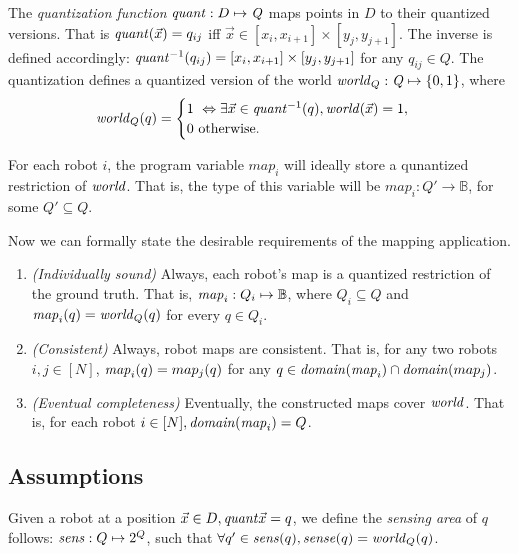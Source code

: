 %
    The \emph{quantization function}  $\mathit{quant}:D \mapsto \mathit{Q}$ maps points in $D$ to their quantized versions. That is $\mathit{quant}(\Vec{x}) = q_{ij}$ iff $\Vec{x} \in [x_i, x_{i+1}] \times [y_j, y_{j+1}]$.
The inverse is defined accordingly: $\mathit{quant}^{-1}(q_{ij}) =  [x_i, x_{i+1}] \times [y_j, y_{j+1}]$ for any $q_{ij} \in Q$. 
%
The quantization defines a quantized version of the world $\mathit{world}_Q : \mathit{Q} \mapsto \left\{0,1\right\}$, where
$$\mathit{world}_Q(q) = \begin{cases}
        1\ \Leftrightarrow \exists \Vec{x}\in \mathit{quant}^{-1}(q), \mathit{world}(\Vec{x}) = 1, \\
        0\ \mbox{otherwise}.
\end{cases}
$$
%

For each robot $i$, the program variable $\mathit{map}_i$ will ideally store a qunantized restriction of $\mathit{world}$. That is, the type of this variable will be $\mathit{map}_i: Q' \rightarrow \mathbb{B}$, for some $Q' \subseteq Q$. 

Now we can formally state the desirable requirements of the mapping application.
\begin{enumerate}
	\item {\em (Individually sound)} Always, each robot's map is a quantized restriction of the ground truth. That is, $\mathit{map}_i: Q_i \mapsto \mathbb{B}$, where $Q_i\subseteq Q$ and  $\mathit{map}_i(q) = \mathit{world}_Q(q)$ for every $q\in Q_i$.
	\item {\em (Consistent)\/} Always, robot maps are consistent. That is, for any two robots $i,j \in [N]$,   $\mathit{map}_i(q) = map_j(q)$  for any  $q\in \mathit{domain}(\mathit{map}_i)  \cap \mathit{domain}(map_j)$.
	\item {\em (Eventual completeness)} Eventually, the constructed maps cover $\mathit{world}$. That is, for each robot $i\in [N], \mathit{domain}(\mathit{map}_i) = Q$.
\end{enumerate}


\subsection{Assumptions}
\label{sec:formal:sensing}

\begin{definition}
   Given a robot at a position $\Vec{x}\in D, \mathit{quant}{\Vec{x}} = q$, we define the \emph{sensing area} of $q$ follows: $\mathit{sens}: Q \mapsto 2^{Q}$, such that  $\forall q^\prime \in \mathit{sens}(q), \mathit{sense}(q) = \mathit{world}_Q(q)$.  
\end{definition}




